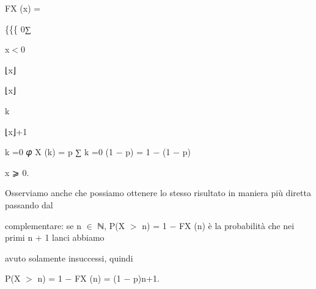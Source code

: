 \documentclass[a4paper,portrait,12pt]{article}
\begin{document}
\begin{flushleft}
FX (x) =
\end{flushleft}





\{\{\{ 0∑





\begin{flushleft}
x$<$0
\end{flushleft}


\begin{flushleft}
⌊x⌋
\end{flushleft}


\begin{flushleft}
⌊x⌋
\end{flushleft}


\begin{flushleft}
k
\end{flushleft}


\begin{flushleft}
⌊x⌋+1
\end{flushleft}


\begin{flushleft}
k =0 𝜑 X (k) = p ∑ k =0 (1 $-$ p) = 1 $-$ (1 $-$ p)
\end{flushleft}





\begin{flushleft}
x ⩾ 0.
\end{flushleft}





\begin{flushleft}
Osserviamo anche che possiamo ottenere lo stesso risultato in maniera più diretta passando dal
\end{flushleft}


\begin{flushleft}
complementare: se n $\in$ ℕ, P(X $>$ n) = 1 $-$ FX (n) \`{e} la probabilit\`{a} che nei primi n + 1 lanci abbiamo
\end{flushleft}


\begin{flushleft}
avuto solamente insuccessi, quindi
\end{flushleft}


\begin{flushleft}
P(X $>$ n) = 1 $-$ FX (n) = (1 $-$ p)n+1.
\end{flushleft}
\end{document}
